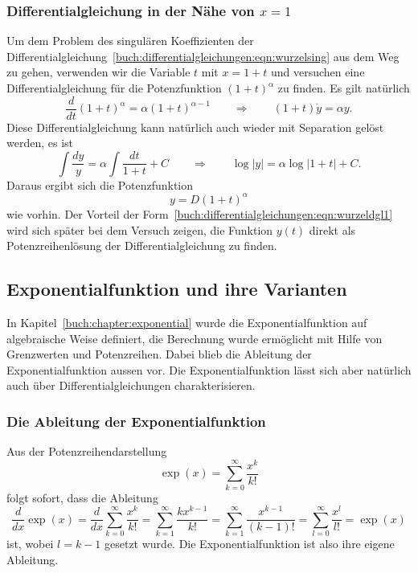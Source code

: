 %
%
\subsubsection{Differentialgleichung in der Nähe von $x=1$}
Um dem Problem des singulären Koeffizienten der
Differentialgleichung~\eqref{buch:differentialgleichungen:eqn:wurzelsing}
aus dem Weg zu gehen, verwenden wir die Variable $t$ mit $x=1+t$ und
versuchen eine Differentialgleichung für die Potenzfunktion
$(1+t)^\alpha$ zu finden.
Es gilt natürlich
\begin{equation}
\frac{d}{dt} (1+t)^\alpha
=
\alpha (1+t)^{\alpha-1}
\qquad\Rightarrow\qquad
(1+t) \dot{y} = \alpha y.
\label{buch:differentialgleichungen:eqn:wurzeldgl1}
\end{equation}
Diese Differentialgleichung kann natürlich auch wieder mit Separation
gelöst werden, es ist
\begin{equation}
\int
\frac{dy}{y} 
=
\alpha
\int
\frac{dt}{1+t}
+
C
\qquad\Rightarrow\qquad
\log|y| = \alpha \log|1+t| + C.
\label{buch:differentialgleichungen:eqn:wurzeldgl1loesung}
\end{equation}
Daraus ergibt sich die Potenzfunktion
\[
y=D(1+t)^\alpha
\]
wie vorhin.
Der Vorteil der
Form~\eqref{buch:differentialgleichungen:eqn:wurzeldgl1}
wird sich später bei dem Versuch zeigen, die Funktion $y(t)$
direkt als Potenzreihenlösung der Differentialgleichung zu finden.

%
%
\subsection{Exponentialfunktion und ihre Varianten
\label{buch:differentialgleichungen:subsection:exponentialfunktion}}
%
In Kapitel~\ref{buch:chapter:exponential} wurde die Exponentialfunktion
auf algebraische Weise definiert, die Berechnung wurde ermöglicht
mit Hilfe von Grenzwerten und Potenzreihen.
Dabei blieb die Ableitung der Exponentialfunktion aussen vor.
Die Exponentialfunktion lässt sich aber natürlich auch über
Differentialgleichungen charakterisieren.

%
%
\subsubsection{Die Ableitung der Exponentialfunktion}
%
Aus der Potenzreihendarstellung
\[
\exp(x)
=
\sum_{k=0}^\infty \frac{x^k}{k!}
\]
folgt sofort, dass die Ableitung
\[
\frac{d}{dx}\exp(x)
=
\frac{d}{dx}
\sum_{k=0}^\infty
\frac{x^k}{k!}
=
\sum_{k=1}^\infty \frac{kx^{k-1}}{k!}
=
\sum_{k=1}^\infty \frac{x^{k-1}}{(k-1)!}
=
\sum_{l=0}^\infty \frac{x^l}{l!}
=
\exp(x)
\]
ist,
wobei $l=k-1$ gesetzt wurde.
Die Exponentialfunktion ist also ihre eigene Ableitung.

